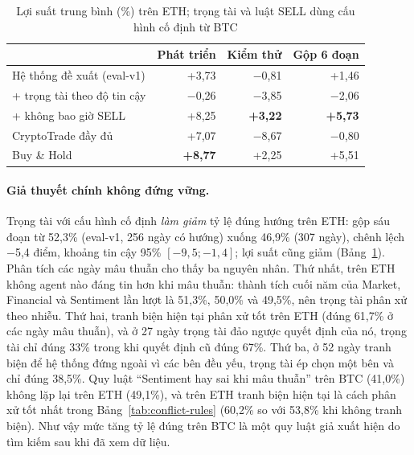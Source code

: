\begin{table}[H]
\centering
\caption{Lợi suất trung bình (\%) trên ETH; trọng tài và luật SELL dùng cấu hình cố định từ BTC}
\label{tab:eth}
\small
\begin{tabular}{lrrr}
\toprule
 & Phát triển & Kiểm thử & Gộp 6 đoạn \\
\midrule
Hệ thống đề xuất (eval-v1) & +3,73 & $-$0,81 & +1,46 \\
\quad + trọng tài theo độ tin cậy & $-$0,26 & $-$3,85 & $-$2,06 \\
\quad + không bao giờ SELL & +8,25 & \textbf{+3,22} & \textbf{+5,73} \\
CryptoTrade đầy đủ & +7,07 & $-$8,67 & $-$0,80 \\
Buy \& Hold & \textbf{+8,77} & +2,25 & +5,51 \\
\bottomrule
\end{tabular}
\end{table}

\paragraph{Giả thuyết chính không đứng vững.} Trọng tài với cấu hình cố định \emph{làm giảm} tỷ lệ đúng hướng trên ETH:
gộp sáu đoạn từ 52,3\% (eval-v1, 256 ngày có hướng) xuống 46,9\% (307 ngày), chênh lệch $-$5,4 điểm, khoảng tin cậy 95\%
$[-9{,}5; -1{,}4]$; lợi suất cũng giảm (Bảng~\ref{tab:eth}). Phân tích các ngày mâu thuẫn cho thấy ba nguyên nhân. Thứ
nhất, trên ETH không agent nào đáng tin hơn khi mâu thuẫn: thành tích cuối năm của Market, Financial và Sentiment lần
lượt là 51,3\%, 50,0\% và 49,5\%, nên trọng tài phân xử theo nhiễu. Thứ hai, tranh biện hiện tại phân xử tốt trên ETH
(đúng 61,7\% ở các ngày mâu thuẫn), và ở 27 ngày trọng tài đảo ngược quyết định của nó, trọng tài chỉ đúng 33\% trong khi
quyết định cũ đúng 67\%. Thứ ba, ở 52 ngày tranh biện để hệ thống đứng ngoài vì các bên đều yếu, trọng tài ép chọn một bên
và chỉ đúng 38,5\%. Quy luật ``Sentiment hay sai khi mâu thuẫn'' trên BTC (41,0\%) không lặp lại trên ETH (49,1\%), và
trên ETH tranh biện hiện tại là cách phân xử tốt nhất trong Bảng~\ref{tab:conflict-rules} (60,2\% so với 53,8\% khi
không tranh biện). Như vậy mức tăng tỷ lệ đúng trên BTC là một quy luật giả xuất hiện do tìm kiếm sau khi đã xem dữ liệu.

